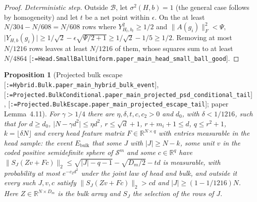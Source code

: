 \documentclass[11pt]{article}
\makeatletter
\newcommand{\formal@break}[1]{\@tfor\formal@tok:=#1\do{%
  \formal@tok
  \expandafter\ifx\formal@tok.\allowbreak\else
  \expandafter\ifx\formal@tok\_\allowbreak\fi\fi}}
\DeclareRobustCommand{\formal}[1]{\textnormal{[\texttt{\small\formal@break{#1}}]}}
\newcommand{\R}{\mathbb{R}}
\newcommand{\Sym}{\mathcal{S}}
\newcommand{\norm}[1]{\lVert #1\rVert}
\newcommand{\abs}[1]{\lvert #1\rvert}
\newcommand{\Fro}{F}
\newcommand{\sqd}{\sqrt{d}}
\newcommand{\Dd}{D}
\theoremstyle{plain}
\newtheorem{proposition}[theorem]{Proposition}
\theoremstyle{definition}
\makeatother
\begin{document}
\begin{proof}
\emph{Deterministic step.} Outside $\mathcal{B}$, let $\sigma^2(H,b) = 1$ (the
general case follows by homogeneity) and let $t$ be a net point within
$\epsilon$. On the at least $N/304 - N/608 = N/608$ rows where
$Y_{H_t,b_t}^2 \ge 1/2$ and $\norm{A(g_i)}_\Fro^2 < \Psi$,
$\abs{Y_{H,b}(g_i)} \ge 1/\sqrt2 - \epsilon\sqrt{\Psi/2 + 1} \ge 1/\sqrt2 - 1/5 \ge 1/2$.
Removing at most $N/1216$ rows leaves at least $N/1216$ of them, whose
squares sum to at least $N/4864$ \formal{Head.SmallBallUniform.paper\_main\_head\_small\_ball\_good}.
\end{proof}

\begin{proposition}[Projected bulk escape \formal{Hybrid.Bulk.paper\_main\_hybrid\_bulk\_event}, \formal{Projected.BulkConditional.paper\_main\_projected\_psd\_conditional\_tail}, \formal{Projected.BulkEscape.paper\_main\_projected\_escape\_tail}; paper Lemma~4.11]\label{prop:bulk}
For $\gamma > 1/4$ there are $\eta, \delta, t, c, c_2 > 0$ and $d_0$, with
$\delta < 1/1216$, such that for $d \ge d_0$, $\abs{N - \gamma d^2} \le \eta d^2$,
$r \le \sqd + 1$, $r + m_i + 1 \le d$, $q \le r^2 + 1$, $k = \lfloor\delta N\rfloor$
and every head feature matrix $F \in \R^{N\times q}$ with entries measurable in
the head sample: the event $E_{\mathrm{bulk}}$ that some $J$ with $\abs{J} \ge N - k$,
some unit $v$ in the coded positive semidefinite sphere of $\Sym^m$ and some
$c \in \R^q$ have $\norm{S_J(Zv + Fc)}_2 \le \sqrt{\abs{J} - q - 1} - \sqrt{\Dd_m/2} - td$
is measurable, with probability at most $e^{-c_2d^2}$ under the joint law of
head and bulk, and outside it every such $J, v, c$ satisfy
$\norm{S_J(Zv + Fc)}_2 > cd$ and $\abs{J} \ge (1 - 1/1216)N$. Here $Z \in \R^{N\times\Dd_m}$
is the bulk array and $S_J$ the selection of the rows of $J$.
\end{proposition}
\end{document}
